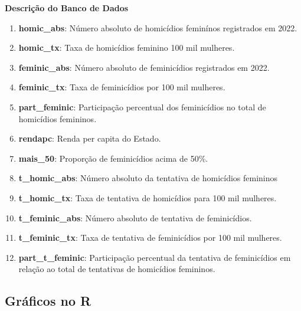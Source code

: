 \documentclass[
  letterpaper,
  DIV=11,
  numbers=noendperiod]{scrreprt}
\begin{document}
\begin{tcolorbox}[enhanced jigsaw, bottomrule=.15mm, leftrule=.75mm, arc=.35mm, colframe=quarto-callout-note-color-frame, breakable, opacityback=0, toprule=.15mm, colback=white, left=2mm, rightrule=.15mm]
\begin{minipage}[t]{5.5mm}
\textcolor{quarto-callout-note-color}{\faInfo}
\end{minipage}%
\begin{minipage}[t]{\textwidth - 5.5mm}

\vspace{-3mm}\textbf{Descrição do Banco de Dados}\vspace{3mm}

\begin{enumerate}
\def\labelenumi{\arabic{enumi}.}
\item
  \textbf{homic\_abs}: Número absoluto de homicídios feminínos
  registrados em 2022.
\item
  \textbf{homic\_tx}: Taxa de homicídios feminino 100 mil mulheres.
\item
  \textbf{feminic\_abs}: Número absoluto de feminicídios registrados em
  2022.
\item
  \textbf{feminic\_tx}: Taxa de feminicídios por 100 mil mulheres.
\item
  \textbf{part\_feminic}: Participação percentual dos feminicídios no
  total de homicídios femininos.
\item
  \textbf{rendapc}: Renda per capita do Estado.
\item
  \textbf{mais\_50}: Proporção de feminicídios acima de 50\%.
\item
  \textbf{t\_homic\_abs}: Número absoluto da tentativa de homicídios
  femininos
\item
  \textbf{t\_homic\_tx}: Taxa de tentativa de homicídios para 100 mil
  mulheres.
\item
  \textbf{t\_feminic\_abs}: Número absoluto de tentativa de
  feminicídios.
\item
  \textbf{t\_feminic\_tx}: Taxa de tentativa de feminicídios por 100 mil
  mulheres.
\item
  \textbf{part\_t\_feminic}: Participação percentual da tentativa de
  feminicídios em relação ao total de tentativas de homicídios
  femininos.
\end{enumerate}

\end{minipage}%
\end{tcolorbox}

\subsection{Gráficos no R}\label{gruxe1ficos-no-r}
\end{document}
